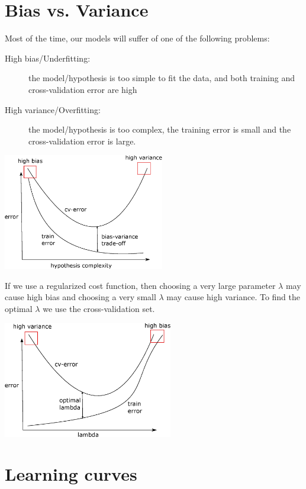 \documentclass[a4paper,11pt]{report}
\begin{document}
\section{Bias vs. Variance}

Most of the time, our models will suffer of one of the following problems:
\begin{description}
  \item[High bias/Underfitting:] the model/hypothesis is too simple to fit the data, and both training and cross-validation error are high
  \item[High variance/Overfitting:] the model/hypothesis is too complex, the training error is small and the cross-validation error is large.
\end{description}

\begin{center}
\includegraphics[height = 2in]{Images/bias_variance}
\end{center}

If we use a regularized cost function, then choosing a very large parameter $\lambda$ may cause high bias and choosing a very small $\lambda$ may cause high variance. To find the optimal $\lambda$ we use the cross-validation set.

\begin{center}
\includegraphics[height = 2in]{Images/bias_variance_lambda}
\end{center}

\section{Learning curves}
\end{document}
